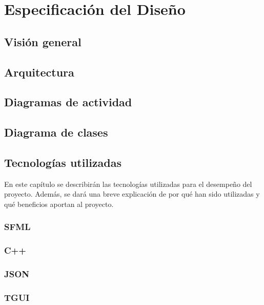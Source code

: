 \chapter{Especificación del Diseño}

\section{Visión general}

\section{Arquitectura}

\section{Diagramas de actividad}

\section{Diagrama de clases}

\section{Tecnologías utilizadas}

	En este capítulo se describirán las tecnologías utilizadas para el desempeño del proyecto. Además, se dará una breve explicación de por qué han sido utilizadas y qué beneficios aportan al proyecto.

	\subsection{SFML}

	\subsection{C++}

	\subsection{JSON}

	\subsection{TGUI}